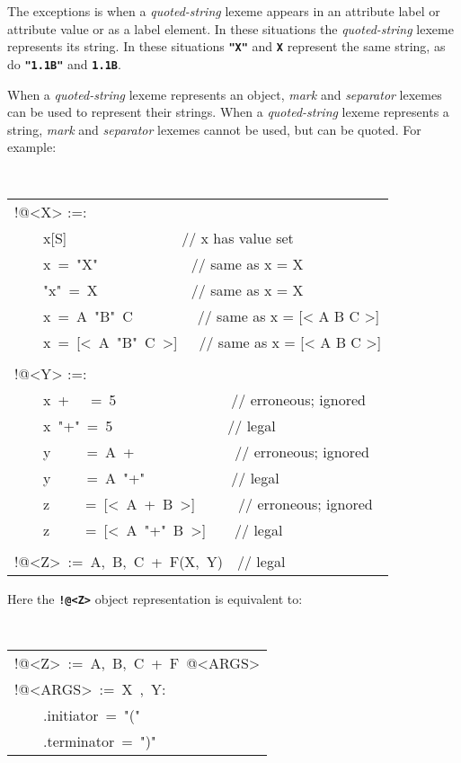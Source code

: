 \documentclass[12pt]{article}
\newcommand{\TT}[1]{{\tt \bfseries #1}}
\newenvironment{indpar}[1][0.3in]%
	{\begin{list}{}%
		     {\setlength{\itemsep}{0in}%
		      \setlength{\topsep}{0in}%
		      \setlength{\parsep}{1ex}%
		      \setlength{\labelwidth}{#1}%
		      \setlength{\leftmargin}{#1}%
		      \addtolength{\leftmargin}{\labelsep}}%
	 \item}%
	{\end{list}}
\begin{document}
The exceptions is when a {\em quoted-string} lexeme appears in an attribute
label or attribute value or as a label element.  In these situations
the {\em quoted-string} lexeme represents its string.  In these situations
\TT{"X"} and \TT{X} represent the same string, as do \TT{"1.1B"}
and \TT{1.1B}.

When a {\em quoted-string} lexeme represents an object, {\em mark}
and {\em separator} lexemes can be used to represent their strings.
When a {\em quoted-string} lexeme represents a string, {\em mark}
and {\em separator} lexemes cannot be used, but can be quoted.
For example:
\begin{indpar}
\tt
\begin{tabular}{l}
!@<X> :=: \\
~~~~x[S]~~~~~~~~~~~~~~~~// x has value set \\
~~~~x~=~"X"~~~~~~~~~~~~~// same as x = X \\
~~~~"x"~=~X~~~~~~~~~~~~~// same as x = X \\
~~~~x~=~A~"B"~C~~~~~~~~~// same as x = [< A B C >] \\
~~~~x~=~[<~A~"B"~C~>]~~~// same as x = [< A B C >] \\
\\
!@<Y> :=: \\
~~~~x~+~~~=~5~~~~~~~~~~~~~~~~// erroneous; ignored \\
~~~~x~"+"~=~5~~~~~~~~~~~~~~~~// legal \\
~~~~y~~~~~=~A~+~~~~~~~~~~~~~~// erroneous; ignored \\
~~~~y~~~~~=~A~"+"~~~~~~~~~~~~// legal \\
~~~~z~~~~~=~[<~A~+~B~>]~~~~~~// erroneous; ignored \\
~~~~z~~~~~=~[<~A~"+"~B~>]~~~~// legal \\
\\
!@<Z>~:=~A,~B,~C~+~F(X,~Y)~~// legal
\end{tabular}
\end{indpar}

Here the \TT{!@<Z>} object representation is equivalent to:
\begin{indpar}
\tt
\begin{tabular}{l}
!@<Z>~:=~A,~B,~C~+~F~@<ARGS> \\
!@<ARGS>~:=~X~,~Y: \\
~~~~.initiator~=~"(" \\
~~~~.terminator~=~")" \\
\end{tabular}
\end{indpar}
\end{document}
